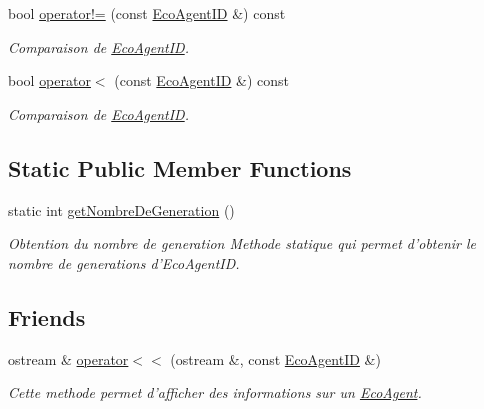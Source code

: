 \begin{CompactItemize}
bool \hyperlink{classEcoAgentID_8ffde7f02500120884ef35ade65b3e6e}{operator!=} (const \hyperlink{classEcoAgentID}{EcoAgentID} \&) const 
\begin{CompactList}\small\item\em Comparaison de \hyperlink{classEcoAgentID}{EcoAgentID}. \item\end{CompactList}\item 
bool \hyperlink{classEcoAgentID_24d44b31302cd2761ffce1df8f74f12c}{operator$<$} (const \hyperlink{classEcoAgentID}{EcoAgentID} \&) const 
\begin{CompactList}\small\item\em Comparaison de \hyperlink{classEcoAgentID}{EcoAgentID}. \item\end{CompactList}\end{CompactItemize}
\subsection*{Static Public Member Functions}
\begin{CompactItemize}
\item 
\hypertarget{classEcoAgentID_9b8f29915bff7e36bf53e695c148517e}{
static int \hyperlink{classEcoAgentID_9b8f29915bff7e36bf53e695c148517e}{getNombreDeGeneration} ()}
\label{classEcoAgentID_9b8f29915bff7e36bf53e695c148517e}

\begin{CompactList}\small\item\em Obtention du nombre de generation Methode statique qui permet d'obtenir le nombre de generations d'EcoAgentID. \item\end{CompactList}\end{CompactItemize}
\subsection*{Friends}
\begin{CompactItemize}
\item 
\hypertarget{classEcoAgentID_d5e8cda1cb99079142dfa371760795cb}{
ostream \& \hyperlink{classEcoAgentID_d5e8cda1cb99079142dfa371760795cb}{operator$<$$<$} (ostream \&, const \hyperlink{classEcoAgentID}{EcoAgentID} \&)}
\label{classEcoAgentID_d5e8cda1cb99079142dfa371760795cb}

\begin{CompactList}\small\item\em Cette methode permet d'afficher des informations sur un \hyperlink{classEcoAgent}{EcoAgent}. \item\end{CompactList}\end{CompactItemize}


